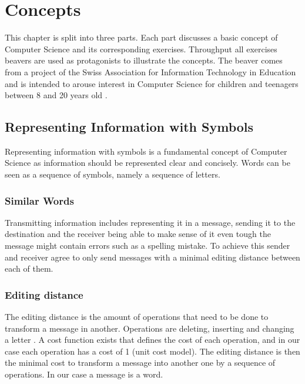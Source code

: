 \chapter{Concepts}

This chapter is split into three parts. Each part discusses a basic concept of Computer Science and its corresponding exercises.
Throughput all exercises beavers are used as protagonists to illustrate the concepts. The beaver comes from a project of the Swiss Association for Information Technology in Education and is intended to arouse interest in Computer Science for children and teenagers between 8 and 20 years old \cite{InformatikBieber}.

\section{Representing Information with Symbols}
\label{section:representing_information_with_symbols}

Representing information with symbols is a fundamental concept of Computer Science as information should be represented clear and concisely. Words can be seen as a sequence of symbols, namely a sequence of letters.

\subsection{Similar Words}

Transmitting information includes representing it in a message, sending it to the destination and the receiver being able to make sense of it even tough the message might contain errors such as a spelling mistake. To achieve this sender and receiver agree to only send messages with a minimal editing distance \cite{AnD} between each of them. 

\subsection*{Editing distance}

The editing distance is the amount of operations that need to be done to transform a message in another. Operations are deleting, inserting and changing a letter . A cost function exists that defines the cost of each operation, and in our case each operation has a cost of 1 (unit cost model). The editing distance is then the minimal cost to transform a message into another one by a sequence of operations. In our case a message is a word.

